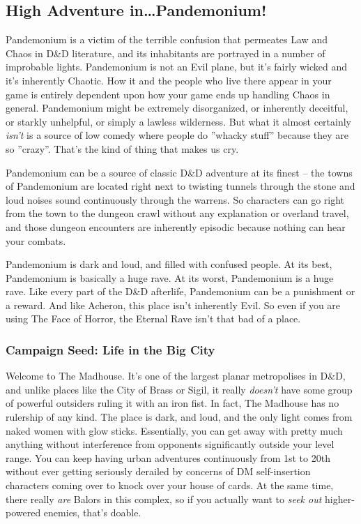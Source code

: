\subsection{High Adventure in\ldots Pandemonium!}

Pandemonium is a victim of the terrible confusion that permeates Law and Chaos in D\&D literature, and its inhabitants are portrayed in a number of improbable lights. Pandemonium is not an Evil plane, but it's fairly wicked and it's inherently Chaotic. How it and the people who live there appear in your game is entirely dependent upon how your game ends up handling Chaos in general. Pandemonium might be extremely disorganized, or inherently deceitful, or starkly unhelpful, or simply a lawless wilderness. But what it almost certainly \textit{isn't} is a source of low comedy where people do ''whacky stuff'' because they are so ''crazy''. That's the kind of thing that makes us cry.

Pandemonium can be a source of classic D\&D adventure at its finest -- the towns of Pandemonium are located right next to twisting tunnels through the stone and loud noises sound continuously through the warrens. So characters can go right from the town to the dungeon crawl without any explanation or overland travel, and those dungeon encounters are inherently episodic because nothing can hear your combats.

Pandemonium is dark and loud, and filled with confused people. At its best, Pandemonium is basically a huge rave. At its worst, Pandemonium is a huge rave. Like every part of the D\&D afterlife, Pandemonium can be a punishment or a reward. And like Acheron, this place isn't inherently Evil. So even if you are using The Face of Horror, the Eternal Rave isn't that bad of a place.

\subsubsection{Campaign Seed: Life in the Big City}

Welcome to The Madhouse. It's one of the largest planar metropolises in D\&D, and unlike places like the City of Brass or Sigil, it really \textit{doesn't} have some group of powerful outsiders ruling it with an iron fist. In fact, The Madhouse has no rulership of any kind. The place is dark, and loud, and the only light comes from naked women with glow sticks. Essentially, you can get away with pretty much anything without interference from opponents significantly outside your level range. You can keep having urban adventures continuously from 1st to 20th without ever getting seriously derailed by concerns of DM self-insertion characters coming over to knock over your house of cards. At the same time, there really \textit{are} Balors in this complex, so if you actually want to \textit{seek out} higher-powered enemies, that's doable.

